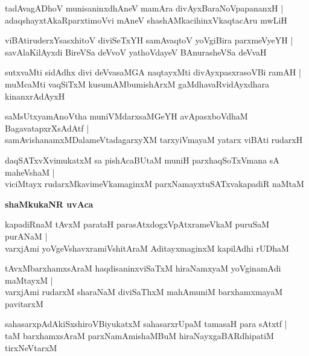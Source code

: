 \documentclass[twoside,12pt,openright]{book}
\newcounter{shloka}[chapter]
\def\uvaca#1{\centerline{{\large\textbf{#1}}}}
\begin{document}
\begin{shloka}
tadAvagADhoV munisaninxdhAneV mamAra divAyxBaraNoVpapananxH |\\
adaqshayxtAkaRparxtimoVvi mAneV shashAMkacihinxVkaqtacAru mwLiH 
\end{shloka}

\begin{shloka}
viBAtiruderxYsasxhitoV diviSeTxYH samAvaqtoV yoVgiBira parxmeVyeYH |\\
savAlaKilAyxdi BireVSa deVvoV yathoVdayeV BAnurasheVSa deVvaH 
\end{shloka}

\begin{shloka}
sutxvaMti sidAdhx divi deVvasaMGA naqtayxMti divAyxpasxrasoVBi ramAH |\\
muMcaMti vaqSiTxM kusumAMbumishArxM gaMdhavaRvidAyxdhara kinanxrAdAyxH 
\end{shloka}

\begin{shloka}
saMsUtxyamAnoVtha muniVMdarxsaMGeYH avApasxboVdhaM BagavatapxrXsAdAtf |\\
samAvishanamxMDalameVtadagarxyXM tarxyiVmayaM yatarx viBAti rudarxH 
\end{shloka}

\begin{shloka}
daqSATxvXvimukatxM sa pishAcaBUtaM muniH parxhaqSoTxVmana sA maheVshaM |\\
viciMtayx rudarxMkavimeVkamaginxM parxNamayxtuSATxvakapadiR naMtaM 
\end{shloka}

\uvaca{ shaMkukaNR uvAca }

\begin{shloka}
kapadiRnaM tAvxM parataH parasAtxdogxVpAtxrameVkaM puruSaM purANaM |\\
varxjAmi yoVgeVshavxramiVshitAraM AditayxmaginxM kapilAdhi rUDhaM 
\end{shloka}

\begin{shloka}
tAvxMbarxhamxsAraM haqdisaninxviSaTxM hiraNamxyaM yoVginamAdi maMtayxM |\\
varxjAmi rudarxM sharaNaM diviSaThxM mahAmuniM barxhamxmayaM pavitarxM 
\end{shloka}

\begin{shloka}
sahasarxpAdAkiSxshiroVBiyukatxM sahasarxrUpaM tamasaH para sAtxtf |\\
taM barxhamxsAraM parxNamAmishaMBuM hiraNayxgaBARdhipatiM tirxNeVtarxM 
\end{shloka}
\end{document}
